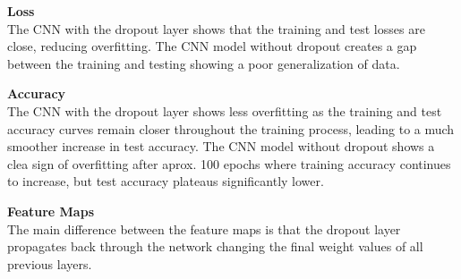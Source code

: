 \textbf{Loss}\\
The CNN with the dropout layer shows that the training and test losses are close, reducing overfitting. The CNN model without dropout creates a gap between the training and testing showing a poor generalization of data.

\textbf{Accuracy}\\
The CNN with the dropout layer shows less overfitting as the training and test accuracy curves remain closer throughout the training process, leading to a much smoother increase in test accuracy. The CNN model without dropout shows a clea sign of overfitting after aprox. 100 epochs where training accuracy continues to increase, but test accuracy plateaus significantly lower.

\textbf{Feature Maps}\\
The main difference between the feature maps is that the dropout layer propagates back through the network changing the final weight values of all previous layers.


